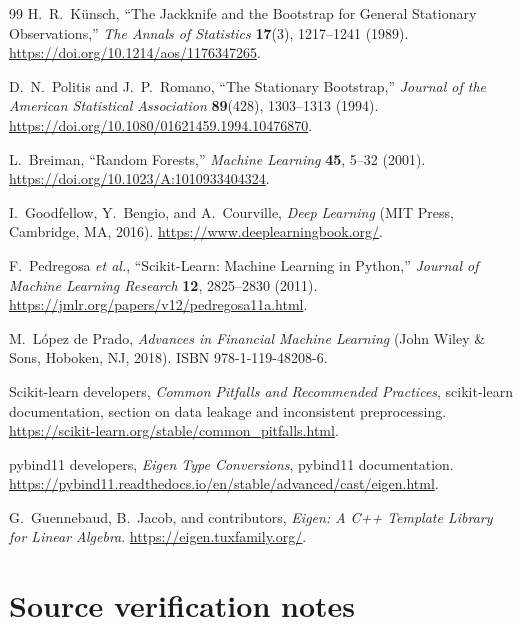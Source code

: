 \documentclass[11pt,a4paper]{article}
\begin{document}
\begin{thebibliography}{99}
H.~R.~K\"unsch,
``The Jackknife and the Bootstrap for General Stationary Observations,''
\emph{The Annals of Statistics} \textbf{17}(3), 1217--1241 (1989).
\url{https://doi.org/10.1214/aos/1176347265}.

D.~N.~Politis and J.~P.~Romano,
``The Stationary Bootstrap,''
\emph{Journal of the American Statistical Association} \textbf{89}(428), 1303--1313 (1994).
\url{https://doi.org/10.1080/01621459.1994.10476870}.

L.~Breiman,
``Random Forests,''
\emph{Machine Learning} \textbf{45}, 5--32 (2001).
\url{https://doi.org/10.1023/A:1010933404324}.

I.~Goodfellow, Y.~Bengio, and A.~Courville,
\emph{Deep Learning} (MIT Press, Cambridge, MA, 2016).
\url{https://www.deeplearningbook.org/}.

F.~Pedregosa \emph{et al.},
``Scikit-Learn: Machine Learning in Python,''
\emph{Journal of Machine Learning Research} \textbf{12}, 2825--2830 (2011).
\url{https://jmlr.org/papers/v12/pedregosa11a.html}.

M.~L\'opez de Prado,
\emph{Advances in Financial Machine Learning}
(John Wiley \& Sons, Hoboken, NJ, 2018).
ISBN 978-1-119-48208-6.

Scikit-learn developers,
\emph{Common Pitfalls and Recommended Practices},
scikit-learn documentation, section on data leakage and inconsistent preprocessing.
\url{https://scikit-learn.org/stable/common_pitfalls.html}.

pybind11 developers,
\emph{Eigen Type Conversions},
pybind11 documentation.
\url{https://pybind11.readthedocs.io/en/stable/advanced/cast/eigen.html}.

G.~Guennebaud, B.~Jacob, and contributors,
\emph{Eigen: A C++ Template Library for Linear Algebra}.
\url{https://eigen.tuxfamily.org/}.

\end{thebibliography}

\appendix
\section{Source verification notes}
\label{app:sourcechecks}
\end{document}
